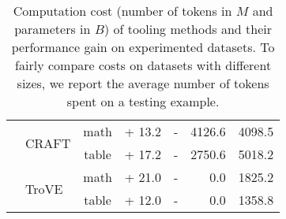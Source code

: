 \begin{table}[ht]
\begin{center}
{\begin{tabular}{llcrcrr}
        {} & \multirow{2}{*}{CRAFT} & \color{ao} {math} & {+ 13.2} & {-} & {4126.6} & {4098.5} \\
        {} & {} & \color{darklavender} {table} & {+ 17.2} & {-} & {2750.6} & {5018.2} \\
        \cmidrule{2-7}
        {} & \multirow{2}{*}{TroVE} & \color{ao} {math} & {+ 21.0} & {-} & {0.0} & {1825.2} \\
        {} & {} & \color{darklavender} {table} & {+ 12.0} & {-} & {0.0} & {1358.8} \\
        \bottomrule
        \end{tabular}
        }
    \end{center}
    \vspace{-2mm}
    \caption{Computation cost (number of tokens in $M$ and parameters in $B$) of tooling methods and their performance gain on experimented datasets. To fairly compare costs on datasets with different sizes, we report the average number of tokens spent on a testing example.}
    \vspace{-3mm}
    \label{tab:compute-cost}
    \end{table}